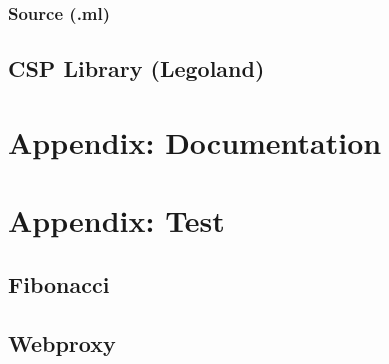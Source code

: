 \documentclass[a4paper,12pt]{article}
\begin{document}
\subsubsection{Source (.ml)}

\subsection{CSP Library (Legoland)}

\normalsize

\newpage
\section{Appendix: Documentation}
\label{appendixDoc}
\begin{center}
  
\end{center}


\newpage
\section{Appendix: Test}
\label{appendixTest}
\scriptsize
\subsection{Fibonacci}


\subsection{Webproxy}

\normalsize
\end{document}
